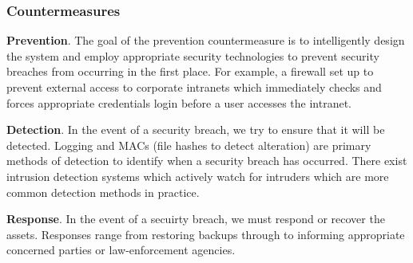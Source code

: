 \documentclass[11pt]{article}
\begin{document}
\subsubsection{Countermeasures}
\textbf{Prevention}. 
The goal of the prevention countermeasure is to intelligently design the system and employ appropriate security technologies to prevent security breaches from occurring in the first place.
For example, a firewall set up to prevent external access to corporate intranets which immediately checks and forces appropriate credentials login before a user accesses the intranet.

\textbf{Detection}.
In the event of a security breach, we try to ensure that it will be detected.
Logging and MACs (file hashes to detect alteration) are primary methods of detection to identify when a security breach has occurred.
There exist intrusion detection systems which actively watch for intruders which are more common detection methods in practice.

\textbf{Response}.
In the event of a secuirty breach, we must respond or recover the assets.
Responses range from restoring backups through to informing appropriate concerned parties or law-enforcement agencies.
\end{document}
